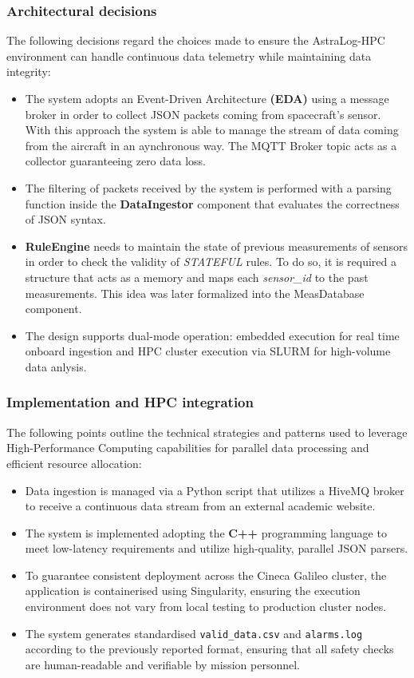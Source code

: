 \documentclass{article}
\begin{document}
\subsubsection{Architectural decisions}
The following decisions regard the choices made to ensure the AstraLog-HPC environment can handle continuous data telemetry while maintaining data integrity: 
\begin{itemize}
    \item The system adopts an Event-Driven Architecture \textbf{(EDA)} using a message broker in order to collect JSON packets coming from spacecraft's sensor. With this approach the system is able to manage the stream of data coming from the aircraft in an aynchronous way. The MQTT Broker topic acts as a collector guaranteeing zero data loss.
    \item The filtering of packets received by the system is performed with a parsing function inside the \textbf{DataIngestor} component that evaluates the correctness of JSON syntax.
    \item \textbf{RuleEngine} needs to maintain the state of previous measurements of sensors in order to check the validity of \textit{STATEFUL} rules. To do so, it is required a structure that acts as a memory and maps each \textit{sensor\_id} to the past measurements. This idea was later formalized into the MeasDatabase component.
    \item The design supports dual-mode operation: embedded execution for real time onboard ingestion and HPC cluster execution via SLURM for high-volume data anlysis. 
\end{itemize}

\subsubsection{Implementation and HPC integration}
The following points outline the technical strategies and patterns used to leverage High-Performance Computing capabilities for parallel data processing and efficient resource allocation:
\begin{itemize}
\item Data ingestion is managed via a Python script that utilizes a HiveMQ broker to receive a continuous data stream from an external academic website.
\item The system is implemented adopting the \textbf{C++} programming language to meet low-latency requirements and utilize high-quality, parallel JSON parsers.
\item To guarantee consistent deployment across the Cineca Galileo cluster, the application is containerised using Singularity, ensuring the execution environment does not vary from local testing to production cluster nodes.
\item The system generates standardised \verb|valid_data.csv| and \verb|alarms.log| according to the previously reported format, ensuring that all safety checks are human-readable and verifiable by mission personnel.  
\end{itemize}
\end{document}
